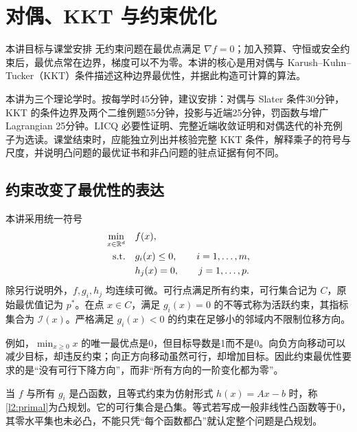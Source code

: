 \chapter{对偶、KKT 与约束优化}
\label{l2:chapter}

\begin{coursebox}{本讲目标与课堂安排}
无约束问题在最优点满足 $\nabla f=0$；加入预算、守恒或安全约束后，最优点常在边界，梯度可以不为零。本讲的核心是用对偶与 Karush--Kuhn--Tucker（KKT）条件描述这种边界最优性，并据此构造可计算的算法。

本讲为三个理论学时。按每学时45分钟，建议安排：对偶与 Slater 条件30分钟，KKT 的条件边界及两个二维例题55分钟，投影与近端25分钟，罚函数与增广 Lagrangian 25分钟。LICQ 必要性证明、完整近端收敛证明和对偶迭代的补充例子为选读。课堂结束时，应能独立列出并核验完整 KKT 条件，解释乘子的符号与尺度，并说明凸问题的最优证书和非凸问题的驻点证据有何不同。
\end{coursebox}

\section{约束改变了最优性的表达}
\label{l2:problem}

本讲采用统一符号
\begin{equation}
 \begin{aligned}
 \min_{x\in\mathbb R^d}\quad & f(x),\\
 \text{s.t.}\quad & g_i(x)\leq0,\qquad i=1,\ldots,m,\\
 & h_j(x)=0,\qquad j=1,\ldots,p.
 \end{aligned}
 \label{l2:primal}
\end{equation}
除另行说明外，$f,g_i,h_j$ 均连续可微。可行点满足所有约束，可行集合记为 $C$，原始最优值记为 $p^*$。在点 $x\in C$，满足 $g_i(x)=0$ 的不等式称为活跃约束，其指标集合为 $\mathcal I(x)$。严格满足 $g_i(x)<0$ 的约束在足够小的邻域内不限制位移方向。

例如，$\min_{x\geq0}x$ 的唯一最优点是0，但目标导数是1而不是0。向负方向移动可以减少目标，却违反约束；向正方向移动虽然可行，却增加目标。因此约束最优性要求的是“没有可行下降方向”，而非“所有方向的一阶变化都为零”。

\begin{definition}[本讲采用的凸规划形式]
当 $f$ 与所有 $g_i$ 是凸函数，且等式约束为仿射形式 $h(x)=Ax-b$ 时，称\eqref{l2:primal}为凸规划。它的可行集合是凸集。等式若写成一般非线性凸函数等于0，其零水平集也未必凸，不能只凭“每个函数都凸”就认定整个问题是凸规划。
\end{definition}

